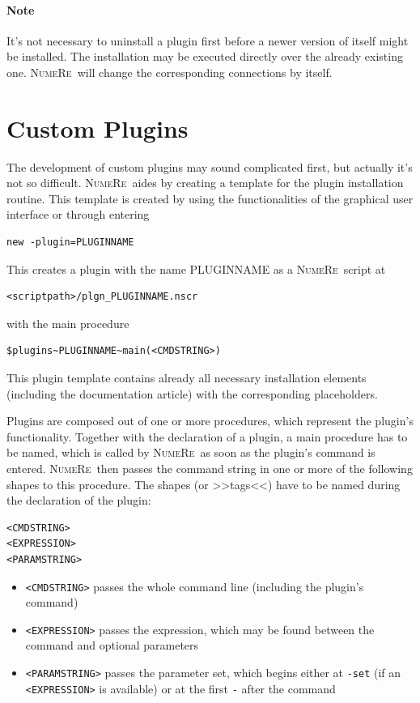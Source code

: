 \documentclass[DIV=14,headsepline,footsepline]{scrbook}
\newcommand{\NR}{\textsc{Nu\-me\-Re}}
\begin{document}
				\paragraph{Note}
					It's not necessary to uninstall a plugin first before a newer version of itself might be installed. The installation may be executed directly over the already existing one. \NR\ will change the corresponding connections by itself.
			\section{Custom Plugins}
				The development of custom plugins may sound complicated first, but actually it's not so difficult. \NR\ aides by creating a template for the plugin installation routine. This template is created by using the functionalities of the graphical user interface or through entering
				\begin{lstlisting}
new -plugin=PLUGINNAME
				\end{lstlisting}
				This creates a plugin with the name PLUGINNAME as a \NR\ script at
				\begin{lstlisting}
<scriptpath>/plgn_PLUGINNAME.nscr
				\end{lstlisting}
				with the main procedure
				\begin{lstlisting}
$plugins~PLUGINNAME~main(<CMDSTRING>)
				\end{lstlisting}
				This plugin template contains already all necessary installation elements (including the documentation article) with the corresponding placeholders.
				
				Plugins are composed out of one or more procedures, which represent the plugin's functionality. Together with the declaration of a plugin, a main procedure has to be named, which is called by \NR\ as soon as the plugin's command is entered. \NR\ then passes the command string in one or more of the following shapes to this procedure. The shapes (or >>tags<<) have to be named during the declaration of the plugin:
				\begin{lstlisting}
<CMDSTRING>
<EXPRESSION>
<PARAMSTRING>
				\end{lstlisting}
				\begin{itemize}
					\item \lstinline+<CMDSTRING>+ passes the whole command line (including the plugin's command)
					\item \lstinline+<EXPRESSION>+ passes the expression, which may be found between the command and optional parameters
					\item \lstinline+<PARAMSTRING>+ passes the parameter set, which begins either at \lstinline+-set+ (if an \lstinline+<EXPRESSION>+ is available) or at the first \lstinline+-+ after the command
				\end{itemize}
				
\end{document}
